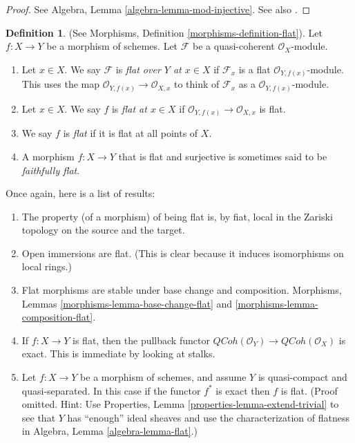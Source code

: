 \documentclass{stacks-project}
\theoremstyle{plain}
\theoremstyle{definition}
\newtheorem{definition}[subsection]{Definition}
\theoremstyle{remark}
\numberwithin{equation}{subsection}
\def\QCoh{\mathit{QCoh}}
\begin{document}
\begin{proof}
See Algebra, Lemma \ref{algebra-lemma-mod-injective}.
See also \cite[Section 20]{MatCA}.
\end{proof}

\begin{definition}
\label{definition-flat-schemes}
(See Morphisms, Definition \ref{morphisms-definition-flat}).
Let $f : X \to Y$ be a morphism of schemes.
Let $\mathcal{F}$ be a quasi-coherent $\mathcal{O}_X$-module.
\begin{enumerate}
\item Let $x \in X$. We say $\mathcal{F}$ is
{\it flat over $Y$ at $x \in X$} if $\mathcal{F}_x$
is a flat $\mathcal{O}_{Y, f(x)}$-module.
This uses the map $\mathcal{O}_{Y, f(x)} \to \mathcal{O}_{X, x}$ to
think of $\mathcal{F}_x$ as a $\mathcal{O}_{Y, f(x)}$-module.
\item Let $x \in X$. We say $f$ is {\it flat at $x \in X$}
if $\mathcal{O}_{Y, f(x)} \to \mathcal{O}_{X, x}$ is flat.
\item We say $f$ is {\it flat} if it is flat at all points of $X$.
\item A morphism $f : X \to Y$ that is flat and surjective is sometimes
said to be {\it faithfully flat}.
\end{enumerate}
\end{definition}

\noindent
Once again, here is a list of results:
\begin{enumerate}
\item The property (of a morphism) of being flat is, by fiat,
local in the Zariski topology on the source and the target.
\item Open immersions are flat. (This is clear because it induces isomorphisms
on local rings.)
\item Flat morphisms are stable under base change and composition.
Morphisms, Lemmas \ref{morphisms-lemma-base-change-flat} and
\ref{morphisms-lemma-composition-flat}.
\item If $f : X \to Y$ is flat, then the pullback functor
$\QCoh(\mathcal{O}_Y) \to \QCoh(\mathcal{O}_X)$ is exact.
This is immediate by looking at stalks.
\item Let $f : X \to Y$ be a morphism of schemes, and assume $Y$
is quasi-compact and quasi-separated. In this case
if the functor $f^*$ is exact then $f$ is flat.
(Proof omitted. Hint: Use
Properties, Lemma \ref{properties-lemma-extend-trivial} to see that
$Y$ has ``enough'' ideal sheaves and use the characterization of
flatness in Algebra, Lemma \ref{algebra-lemma-flat}.)
\end{enumerate}
\end{document}
